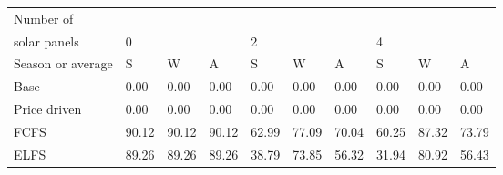 \begin{table}[h] 
\centering 
\begin{tabular}{l|lll|lll|lll}Number of \\ solar panels&0& & &2& & &4& & \\ \hline 
Season or average & S & W & A & S & W & A & S & W & A \\ \hline 
Base&0.00&0.00&0.00&0.00&0.00&0.00&0.00&0.00&0.00 \\ 
Price driven&0.00&0.00&0.00&0.00&0.00&0.00&0.00&0.00&0.00 \\ 
FCFS&90.12&90.12&90.12&62.99&77.09&70.04&60.25&87.32&73.79 \\ 
ELFS&89.26&89.26&89.26&38.79&73.85&56.32&31.94&80.92&56.43 \\ 
\end{tabular} 
\end{table}